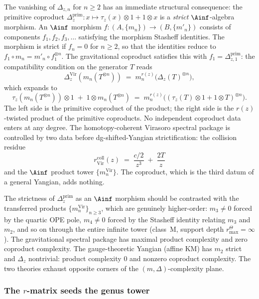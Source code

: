 The vanishing of $\Delta_{z,n}$ for $n \ge 2$ has an immediate
structural consequence: the primitive coproduct
$\Delta_z^{\mathrm{prim}} \colon x \mapsto
\tau_z(x) \otimes 1 + 1 \otimes x$ is a \emph{strict}
$\Ainf$-algebra morphism. An $\Ainf$ morphism
$f \colon (A, \{m_n\}) \to (B, \{m'_n\})$ consists of
components $f_1, f_2, f_3, \ldots$ satisfying the morphism
Stasheff identities. The morphism is strict if $f_n = 0$ for
$n \ge 2$, so that the identities reduce to
$f_1 \circ m_n = m'_n \circ f_1^{\otimes n}$. The
gravitational coproduct satisfies this with
$f_1 = \Delta_{z,1}^{\mathrm{prim}}$: the compatibility
condition on the generator $T$ reads
\begin{equation}\label{eq:compatibility-primitive}
\Delta_z^{\mathrm{Vir}}(m_n(T^{\otimes n}))
\;=\;
m_n^{r(z)}\bigl(\Delta_z(T)^{\otimes n}\bigr),
\end{equation}
which expands to
\[
\tau_z(m_n(T^{\otimes n})) \otimes 1
\;+\; 1 \otimes m_n(T^{\otimes n})
\;=\;
m_n^{r(z)}\bigl(
(\tau_z(T) \otimes 1 + 1 \otimes T)^{\otimes n}\bigr).
\]
The left side is the primitive coproduct of the product; the
right side is the $r(z)$-twisted product of the primitive
coproducts. No independent coproduct data enters at any
degree. The homotopy-coherent Virasoro spectral package is controlled
by two data before dg-shifted-Yangian strictification: the collision residue
\begin{equation}\label{eq:gravity-r-matrix-determines-all}
r_{\mathrm{Vir}}^{\mathrm{coll}}(z)
\;=\;
\frac{c/2}{z^3} \;+\; \frac{2T}{z}
\end{equation}
and the $\Ainf$ product tower $\{m_n^{\mathrm{Vir}}\}$. The
coproduct, which is the third datum of a general Yangian, adds
nothing.

The strictness of $\Delta_z^{\mathrm{prim}}$ as an $\Ainf$
morphism should be contrasted with the transferred products
$\{m_n^{\mathrm{Vir}}\}_{n \ge 3}$, which are genuinely
higher-order: $m_3 \ne 0$ forced by the quartic OPE pole,
$m_4 \ne 0$ forced by the Stasheff identity relating $m_3$
and $m_2$, and so on through the entire infinite tower
(class~M, support depth \(r^\Theta_{\max}=\infty\)). The gravitational
spectral package has maximal product complexity and zero coproduct
complexity. The gauge-theoretic Yangian (affine KM) has
$m_2$ strict and $\Delta_z$ nontrivial: product complexity
$0$ and nonzero coproduct complexity. The two theories exhaust
opposite corners of the $(m, \Delta)$-complexity plane.

\subsubsection*{The $r$-matrix seeds the genus tower}
\label{par:btz-r-matrix}

